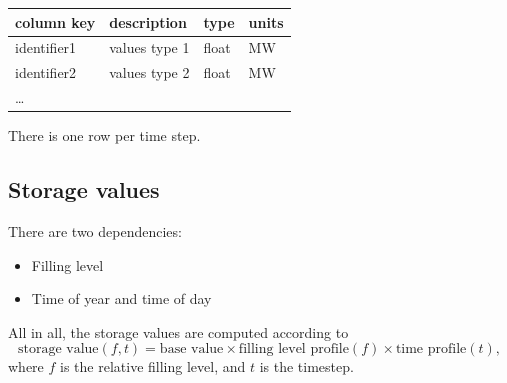 \documentclass{article}
\begin{document}
%
%
%
%
%
%
%
%




\medskip
\begin{tabular}{llll}
	\hline
	column key & description 			& type & units \\
	\hline
	identifier1	& values type 1 		& float	& MW \\
	identifier2	& values type 2		& float	& MW \\
	\dots & & & \\
	\hline
\end{tabular}
\medskip

\noindent
There is one row per time step.




\subsection{Storage values}
There are two dependencies:

\begin{itemize}
\item Filling level
\item Time of year and time of day
\end{itemize}
All in all, the storage values are computed according to
\begin{equation}
	\label{eq:storagevalue_calc}
	 \text{storage value}(f,t) = \text{base value} \times \text{filling level profile}(f) \times \text{time profile}(t),
\end{equation}
where $f$ is the relative filling level, and $t$ is the timestep.
\end{document}
